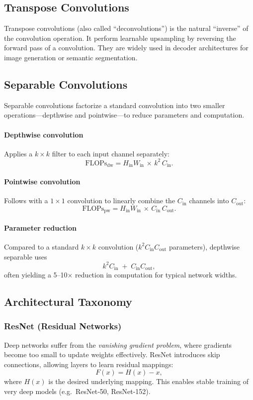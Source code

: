 \documentclass{article}
\begin{document}
\subsection{Transpose Convolutions}
Transpose convolutions (also called “deconvolutions”) is the natural “inverse” of the convolution operation. It perform learnable upsampling by reversing the forward pass of a convolution. They are widely used in decoder architectures for image generation or semantic segmentation.  

\subsection{Separable Convolutions}
Separable convolutions factorize a standard convolution into two smaller operations—depthwise and pointwise—to reduce parameters and computation.

\paragraph{Depthwise convolution}
Applies a $k\times k$ filter to each input channel separately:
\[
\text{FLOPs}_{\mathrm{dw}}
= H_{\mathrm{in}}W_{\mathrm{in}} \,\times\,k^2\,C_{\mathrm{in}}.
\]

\paragraph{Pointwise convolution}
Follows with a $1\times1$ convolution to linearly combine the $C_{\mathrm{in}}$ channels into $C_{\mathrm{out}}$:
\[
\text{FLOPs}_{\mathrm{pw}}
= H_{\mathrm{in}}W_{\mathrm{in}} \,\times\,C_{\mathrm{in}}\,C_{\mathrm{out}}.
\]

\paragraph{Parameter reduction}
Compared to a standard $k\times k$ convolution ($k^2C_{\mathrm{in}}C_{\mathrm{out}}$ parameters), depthwise separable uses
\[
k^2C_{\mathrm{in}} \;+\; C_{\mathrm{in}}C_{\mathrm{out}},
\]
often yielding a 5–10× reduction in computation for typical network widths.


\subsection{Architectural Taxonomy}

\subsubsection{ResNet (Residual Networks)}
Deep networks suffer from the \textit{vanishing gradient problem}, where gradients become too small to update weights effectively. ResNet introduces skip connections, allowing layers to learn residual mappings:
\[
F(x) = H(x) - x,
\]
where $H(x)$ is the desired underlying mapping. This enables stable training of very deep models (e.g.\ ResNet‑50, ResNet‑152).
\end{document}
